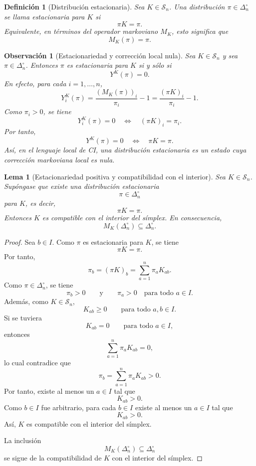 ﻿\documentclass[12pt]{article}
\newtheorem{definicion}{Definición}[section]
\newtheorem{lema}{Lema}[section]
\newtheorem{observacion}{Observación}[section]
\begin{document}


\begin{definicion}[Distribución estacionaria]\label{def:estacionaria_markov}
Sea \(K\in\mathcal S_n\). Una distribución \(\pi\in\Delta_n^\circ\) se llama estacionaria para \(K\) si
\[
\pi K=\pi.
\]
Equivalente, en términos del operador markoviano \(M_K\), esto significa que
\[
M_K(\pi)=\pi.
\]
\end{definicion}


\begin{observacion}[Estacionariedad y corrección local nula]\label{obs:estacionaria_correccion_nula}
Sea \(K\in\mathcal S_n\) y sea \(\pi\in\Delta_n^\circ\). Entonces \(\pi\) es estacionaria para \(K\) si y sólo si
\[
Y^K(\pi)=0.
\]
En efecto, para cada \(i=1,\dots,n\),
\[
Y_i^K(\pi)
=
\frac{(M_K(\pi))_i}{\pi_i}-1
=
\frac{(\pi K)_i}{\pi_i}-1.
\]
Como \(\pi_i>0\), se tiene
\[
Y_i^K(\pi)=0
\quad\Longleftrightarrow\quad
(\pi K)_i=\pi_i.
\]
Por tanto,
\[
Y^K(\pi)=0
\quad\Longleftrightarrow\quad
\pi K=\pi.
\]
Así, en el lenguaje local de CI, una distribución estacionaria es un estado cuya corrección markoviana local es nula.
\end{observacion}



\begin{lema}[Estacionariedad positiva y compatibilidad con el interior]\label{lem:estacionaria_implica_interior}
Sea \(K\in\mathcal S_n\). Supóngase que existe una distribución estacionaria
\[
\pi\in\Delta_n^\circ
\]
para \(K\), es decir,
\[
\pi K=\pi.
\]
Entonces \(K\) es compatible con el interior del símplex. En consecuencia,
\[
M_K(\Delta_n^\circ)\subseteq \Delta_n^\circ.
\]
\end{lema}

\begin{proof}
Sea \(b\in I\). Como \(\pi\) es estacionaria para \(K\), se tiene
\[
\pi K=\pi.
\]
Por tanto,
\[
\pi_b=(\pi K)_b=\sum_{a=1}^n \pi_aK_{ab}.
\]
Como \(\pi\in\Delta_n^\circ\), se tiene
\[
\pi_b>0
\qquad\text{y}\qquad
\pi_a>0
\quad\text{para todo }a\in I.
\]
Además, como \(K\in\mathcal S_n\),
\[
K_{ab}\ge 0
\qquad\text{para todo }a,b\in I.
\]
Si se tuviera
\[
K_{ab}=0
\qquad\text{para todo }a\in I,
\]
entonces
\[
\sum_{a=1}^n \pi_aK_{ab}=0,
\]
lo cual contradice que
\[
\pi_b=\sum_{a=1}^n \pi_aK_{ab}>0.
\]
Por tanto, existe al menos un \(a\in I\) tal que
\[
K_{ab}>0.
\]
Como \(b\in I\) fue arbitrario, para cada \(b\in I\) existe al menos un \(a\in I\) tal que
\[
K_{ab}>0.
\]
Así, \(K\) es compatible con el interior del símplex.

La inclusión
\[
M_K(\Delta_n^\circ)\subseteq \Delta_n^\circ
\]
se sigue de la compatibilidad de \(K\) con el interior del símplex.
\end{proof}
\end{document}
